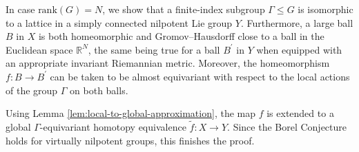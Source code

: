 \documentclass[12pt]{amsart}
\theoremstyle{definition}
\numberwithin{equation}{section}
\newcommand{\rank}{{\text{rank}}}
\begin{document}
In case $\rank (G) = N$, we show that a finite-index subgroup $\Gamma \leq G$ is isomorphic to  a lattice in a simply connected nilpotent Lie group $Y$. Furthermore, a large ball $B $ in $ X $ is both homeomorphic and Gromov--Hausdorff close to a ball in the Euclidean space $\mathbb{R}^N$, the same being true for a ball $B^{\prime}$ in $Y$ when equipped with an appropriate invariant Riemannian metric. Moreover, the homeomorphism $ f : B \to B^{\prime}$ can be taken to be almost equivariant with respect to the local actions of the group $\Gamma$ on both balls. 

Using Lemma \ref{lem:local-to-global-approximation}, the map $f$ is extended to a global $\Gamma$-equivariant homotopy equivalence $\tilde{f} : X \to Y$. Since the Borel Conjecture holds for virtually nilpotent groups, this finishes the proof. 











\color{black}
\end{document}
